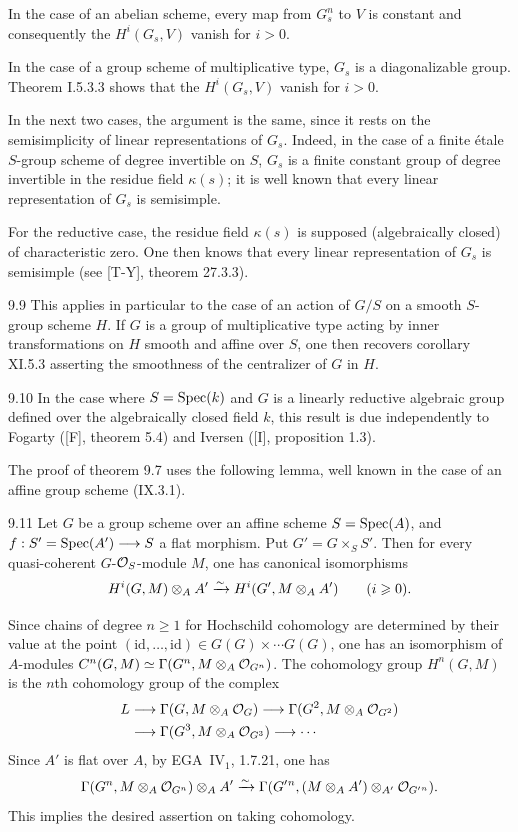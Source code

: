 In the case of an abelian scheme, every map from $G_s^n$ to $V$ is constant and consequently the $H^i(G_s,V)$ vanish for $i>0$.

In the case of a group scheme of multiplicative type, $G_s$ is a diagonalizable group. Theorem I.5.3.3 shows that the $H^i(G_s,V)$ vanish for $i>0$.

In the next two cases, the argument is the same, since it rests on the semisimplicity of linear representations of $G_s$. Indeed, in the case of a finite étale $S$-group scheme of degree invertible on $S$, $G_s$ is a finite constant group of degree invertible in the residue field $\kappa(s)$; it is well known that every linear representation of $G_s$ is semisimple.

For the reductive case, the residue field $\kappa(s)$ is supposed (algebraically closed) of characteristic zero. One then knows that every linear representation of $G_s$ is semisimple (see [T-Y], theorem 27.3.3).
\begin{remark}{9.9}\label{XII.9.9}
This applies in particular to the case of an action of $G/S$ on a smooth $S$-group scheme $H$. If $G$ is a group of multiplicative type acting by inner transformations on $H$ smooth and affine over $S$, one then recovers corollary XI.5.3 asserting the smoothness of the centralizer of $G$ in $H$.
\end{remark}
\begin{remark}{9.10}\label{XII.9.10}
In the case where $S=\operatorname{Spec}(k)$ and $G$ is a linearly reductive algebraic group defined over the algebraically closed field $k$, this result is due independently to Fogarty ([F], theorem 5.4) and Iversen ([I], proposition 1.3).
\end{remark}

The proof of theorem 9.7 uses the following lemma, well known in the case of an affine group scheme (IX.3.1).
\begin{lemma}{9.11}\label{XII.9.11}
Let $G$ be a group scheme over an affine scheme $S=\operatorname{Spec}(A)$, and $f:S'=\operatorname{Spec}(A')\longrightarrow S$ a flat morphism. Put $G'=G\times_S S'$. Then for every quasi-coherent $G$-$\mathcal{O}_S$-module $M$, one has canonical isomorphisms
\[
H^i(G,M)\otimes_A A'\xrightarrow{\sim} H^i(G',M\otimes_A A')\qquad(i\geqslant0).
\]
\end{lemma}
Since chains of degree $n\ge1$ for Hochschild cohomology are determined by their value at the point $(\mathrm{id},\ldots,\mathrm{id})\in G(G)\times\cdots G(G)$, one has an isomorphism of $A$-modules $C^n(G,M)\simeq\Gamma(G^n,M\otimes_A\mathcal{O}_{G^n})$. The cohomology group $H^n(G,M)$ is the $n$th cohomology group of the complex
\[
\begin{aligned}
L&\longrightarrow\Gamma(G,M\otimes_A\mathcal{O}_G)\longrightarrow\Gamma(G^2,M\otimes_A\mathcal{O}_{G^2})\\
&\longrightarrow\Gamma(G^3,M\otimes_A\mathcal{O}_{G^3})\longrightarrow\cdots
\end{aligned}
\]
Since $A'$ is flat over $A$, by EGA~IV$_1$, 1.7.21, one has
\[
\Gamma(G^n,M\otimes_A\mathcal{O}_{G^n})\otimes_A A'
\xrightarrow{\sim}\Gamma(G'{}^n,(M\otimes_A A')\otimes_{A'}\mathcal{O}_{G'{}^n}).
\]
This implies the desired assertion on taking cohomology.

